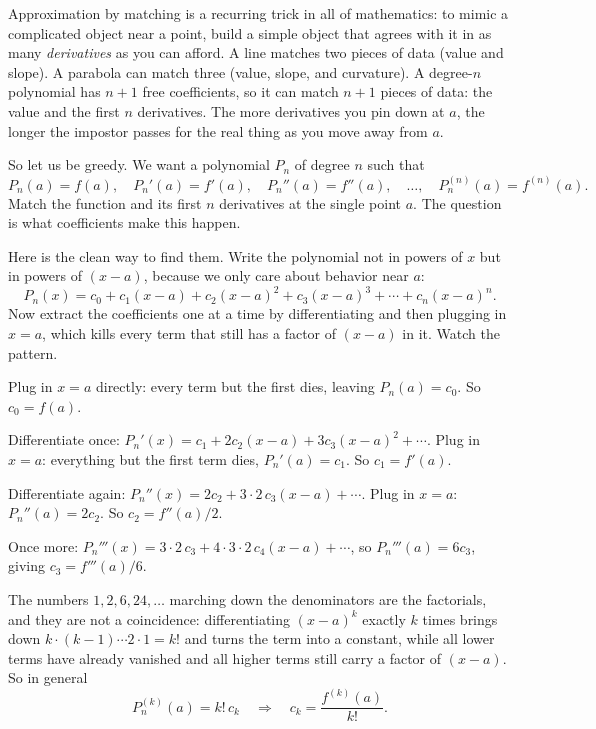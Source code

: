 \begin{intuitionbox}
Approximation by matching is a recurring trick in all of mathematics: to mimic a
complicated object near a point, build a simple object that agrees with it in as many
\emph{derivatives} as you can afford. A line matches two pieces of data (value and
slope). A parabola can match three (value, slope, and curvature). A degree-$n$
polynomial has $n+1$ free coefficients, so it can match $n+1$ pieces of data: the
value and the first $n$ derivatives. The more derivatives you pin down at $a$, the
longer the impostor passes for the real thing as you move away from $a$.
\end{intuitionbox}

So let us be greedy. We want a polynomial $P_n$ of degree $n$ such that
\[
  P_n(a) = f(a), \quad P_n'(a) = f'(a), \quad P_n''(a) = f''(a), \quad \dots, \quad
  P_n^{(n)}(a) = f^{(n)}(a).
\]
Match the function and its first $n$ derivatives at the single point $a$. The
question is what coefficients make this happen.

Here is the clean way to find them. Write the polynomial not in powers of $x$ but in
powers of $(x-a)$, because we only care about behavior near $a$:
\[
  P_n(x) = c_0 + c_1(x-a) + c_2(x-a)^2 + c_3(x-a)^3 + \cdots + c_n(x-a)^n.
\]
Now extract the coefficients one at a time by differentiating and then plugging in
$x=a$, which kills every term that still has a factor of $(x-a)$ in it. Watch the
pattern.

Plug in $x=a$ directly: every term but the first dies, leaving $P_n(a) = c_0$. So
$c_0 = f(a)$.

Differentiate once: $P_n'(x) = c_1 + 2c_2(x-a) + 3c_3(x-a)^2 + \cdots$. Plug in
$x=a$: everything but the first term dies, $P_n'(a) = c_1$. So $c_1 = f'(a)$.

Differentiate again: $P_n''(x) = 2c_2 + 3\cdot 2\, c_3 (x-a) + \cdots$. Plug in
$x=a$: $P_n''(a) = 2c_2$. So $c_2 = f''(a)/2$.

Once more: $P_n'''(x) = 3\cdot 2\, c_3 + 4\cdot 3\cdot 2\, c_4 (x-a) + \cdots$, so
$P_n'''(a) = 6c_3$, giving $c_3 = f'''(a)/6$.

The numbers $1, 2, 6, 24, \dots$ marching down the denominators are the factorials,
and they are not a coincidence: differentiating $(x-a)^k$ exactly $k$ times brings
down $k \cdot (k-1) \cdots 2 \cdot 1 = k!$ and turns the term into a constant, while
all lower terms have already vanished and all higher terms still carry a factor of
$(x-a)$. So in general
\[
  P_n^{(k)}(a) = k!\, c_k \quad\Longrightarrow\quad c_k = \frac{f^{(k)}(a)}{k!}.
\]


